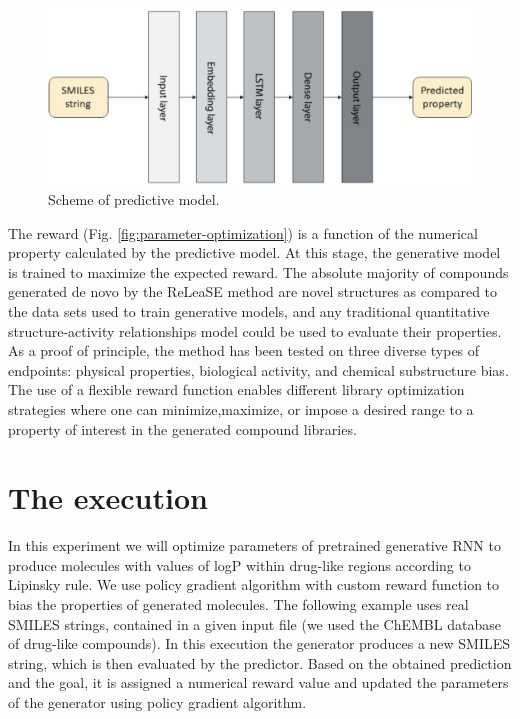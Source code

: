 \documentclass[a4paper]{article}
\begin{document}
\begin{figure}[htbp]
    \centering
        \includegraphics[width=\textwidth]{smiles-to-predicted-property.png}
    \caption{Scheme of predictive model.}
    \label{fig:smiles-to-predicted-property}
\end{figure}
	
The reward (Fig. \ref{fig:parameter-optimization}) is a function of the numerical property calculated by the predictive model. At this stage, the generative model is trained to maximize the expected reward.
The absolute majority of compounds generated de novo by the ReLeaSE method are novel structures as compared to the data sets used to train generative models, and any traditional quantitative structure-activity relationships model could be used to evaluate their properties.
As a proof of principle, the method has been tested on three diverse types of endpoints: physical properties, biological activity, and chemical substructure bias. The use of a flexible reward function enables different library optimization strategies where one can minimize,maximize, or impose a desired range to a property of interest in the generated compound libraries.

\section{The execution}\label{sec:The execution}

In this experiment we will optimize parameters of pretrained generative RNN to produce molecules with values of logP within drug-like regions according to Lipinsky rule. We use policy gradient algorithm with custom reward function to bias the properties of generated molecules.
The following example uses real SMILES strings, contained in a given input file (we used the ChEMBL database of drug-like compounds).
In this execution the generator produces a new SMILES string, which is then evaluated by the predictor. Based on the obtained prediction and the goal, it is assigned a numerical reward value and updated the parameters of the generator using policy gradient algorithm.
 
\end{document}
